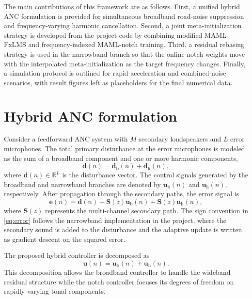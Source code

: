 \documentclass{internoise2026}
\begin{document}
The main contributions of this framework are as follows. First, a unified hybrid ANC formulation is provided for simultaneous broadband road-noise suppression and frequency-varying harmonic cancellation. Second, a joint meta-initialization strategy is developed from the project code by combining modified MAML-FxLMS and frequency-indexed MAML-notch training. Third, a residual rebasing strategy is used in the narrowband branch so that the online notch weights move with the interpolated meta-initialization as the target frequency changes. Finally, a simulation protocol is outlined for rapid acceleration and combined-noise scenarios, with result figures left as placeholders for the final numerical data.

\section{Hybrid ANC formulation}

Consider a feedforward ANC system with $M$ secondary loudspeakers and $L$ error microphones. The total primary disturbance at the error microphones is modeled as the sum of a broadband component and one or more harmonic components,
\begin{equation}
  \mathbf{d}(n) = \mathbf{d}_{\mathrm{b}}(n) + \mathbf{d}_{\mathrm{h}}(n),
  \label{eq:disturbance}
\end{equation}
where $\mathbf{d}(n)\in\mathbb{R}^{L}$ is the disturbance vector. The control signals generated by the broadband and narrowband branches are denoted by $\mathbf{u}_{\mathrm{b}}(n)$ and $\mathbf{u}_{\mathrm{h}}(n)$, respectively. After propagation through the secondary paths, the error signal is
\begin{equation}
  \mathbf{e}(n) =
  \mathbf{d}(n)
  + \mathbf{S}(z)\mathbf{u}_{\mathrm{b}}(n)
  + \mathbf{S}(z)\mathbf{u}_{\mathrm{h}}(n),
  \label{eq:error}
\end{equation}
where $\mathbf{S}(z)$ represents the multi-channel secondary path. The sign convention in \eqref{eq:error} follows the narrowband implementation in the project, where the secondary sound is added to the disturbance and the adaptive update is written as gradient descent on the squared error.

The proposed hybrid controller is decomposed as
\begin{equation}
  \mathbf{u}(n)=\mathbf{u}_{\mathrm{b}}(n)+\mathbf{u}_{\mathrm{h}}(n).
  \label{eq:control_sum}
\end{equation}
This decomposition allows the broadband controller to handle the wideband residual structure while the notch controller focuses its degrees of freedom on rapidly varying tonal components.
\end{document}
